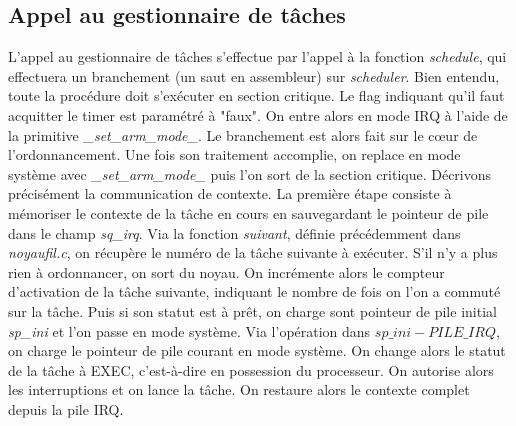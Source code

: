 \subsection{Appel au gestionnaire de tâches}
L'appel au gestionnaire de tâches s'effectue par l'appel à la fonction \textit{schedule}, qui effectuera un branchement (un saut en assembleur) sur \textit{scheduler}.
Bien entendu, toute la procédure doit s'exécuter en section critique. Le flag indiquant qu'il faut acquitter le timer est paramétré à "faux". On entre alors en mode IRQ à l'aide de la primitive \textit{\_set\_arm\_mode\_}. Le branchement est alors fait sur le cœur de l'ordonnancement. Une fois son traitement accomplie, on replace en mode système avec \textit{\_set\_arm\_mode\_} puis l'on sort de la section critique.
Décrivons précisément la communication de contexte. La première étape consiste à mémoriser le contexte de la tâche en cours en sauvegardant le pointeur de pile dans le champ \textit{sq\_irq}. Via la fonction \textit{suivant}, définie précédemment dans \textit{noyaufil.c}, on récupère le numéro de la tâche suivante à exécuter. S'il n'y a plus rien à ordonnancer, on sort du noyau. On incrémente alors le compteur d'activation de la tâche suivante, indiquant le nombre de fois on l'on a commuté sur la tâche. Puis si son statut est à prêt, on charge sont pointeur de pile initial \textit{sp\_ini} et l'on passe en mode système. Via l'opération dans $sp\_ini - PILE\_IRQ$, on charge le pointeur de pile courant en mode système. On change alors le statut de la tâche à EXEC, c'est-à-dire en possession du processeur. On autorise alors les interruptions et on lance la tâche. On restaure alors le contexte complet depuis la pile IRQ.
